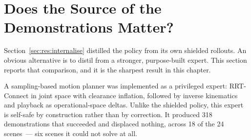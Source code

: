 %
%
%
%

\section{Does the Source of the Demonstrations Matter?}\label{sec:res:source}

Section~\ref{sec:res:internalise} distilled the policy from its own shielded rollouts. An obvious
alternative is to distil from a stronger, purpose-built expert. This section reports that
comparison, and it is the sharpest result in this chapter.

A sampling-based motion planner was implemented as a privileged expert: RRT-Connect in joint space
with clearance inflation, followed by inverse kinematics and playback as operational-space deltas.
Unlike the shielded policy, this expert is self-safe by construction rather than by correction. It
produced 318 demonstrations that succeeded and displaced nothing, across 18 of the 24 scenes~---
six scenes it could not solve at all.

